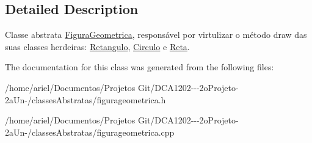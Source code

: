 \subsection{Detailed Description}
Classe abstrata \hyperlink{class_figura_geometrica}{Figura\+Geometrica}, responsável por virtulizar o método draw das suas classes herdeiras\+: \hyperlink{class_retangulo}{Retangulo}, \hyperlink{class_circulo}{Circulo} e \hyperlink{class_reta}{Reta}. 

The documentation for this class was generated from the following files\+:\begin{DoxyCompactItemize}
\item 
/home/ariel/\+Documentos/\+Projetos Git/\+D\+C\+A1202-\/-\/-\/2o\+Projeto-\/2a\+Un-\//classes\+Abstratas/figurageometrica.\+h\item 
/home/ariel/\+Documentos/\+Projetos Git/\+D\+C\+A1202-\/-\/-\/2o\+Projeto-\/2a\+Un-\//classes\+Abstratas/figurageometrica.\+cpp\end{DoxyCompactItemize}

